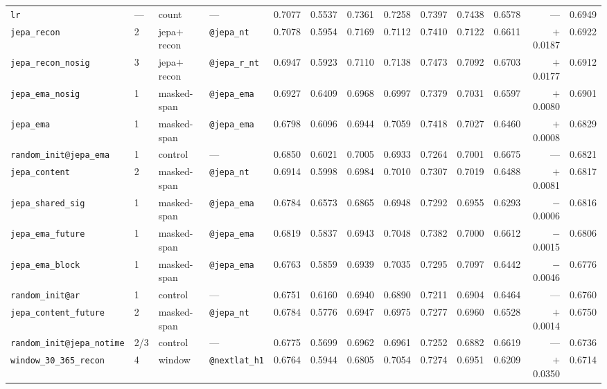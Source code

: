 \documentclass[11pt,a4paper]{article}
\newcommand{\code}[1]{\texttt{\small #1}}
\begin{document}
\begin{table}[p]
{\begin{tabular}{llll rrrrrrr rr}
\code{lr}                       & --- & count & --- & 0.7077 & 0.5537 & 0.7361 & 0.7258 & 0.7397 & 0.7438 & 0.6578 & --- & 0.6949 \\
\code{jepa\_recon}              & 2 & jepa$+$recon & \code{@jepa\_nt} & 0.7078 & 0.5954 & 0.7169 & 0.7112 & 0.7410 & 0.7122 & 0.6611 & $+$0.0187 & 0.6922 \\
\code{jepa\_recon\_nosig}       & 3 & jepa$+$recon & \code{@jepa\_r\_nt} & 0.6947 & 0.5923 & 0.7110 & 0.7138 & 0.7473 & 0.7092 & 0.6703 & $+$0.0177 & 0.6912 \\
\code{jepa\_ema\_nosig}         & 1 & masked-span & \code{@jepa\_ema} & 0.6927 & 0.6409 & 0.6968 & 0.6997 & 0.7379 & 0.7031 & 0.6597 & $+$0.0080 & 0.6901 \\
\code{jepa\_ema}                & 1 & masked-span & \code{@jepa\_ema} & 0.6798 & 0.6096 & 0.6944 & 0.7059 & 0.7418 & 0.7027 & 0.6460 & $+$0.0008 & 0.6829 \\
\code{random\_init@jepa\_ema}   & 1 & control & --- & 0.6850 & 0.6021 & 0.7005 & 0.6933 & 0.7264 & 0.7001 & 0.6675 & --- & 0.6821 \\
\code{jepa\_content}            & 2 & masked-span & \code{@jepa\_nt} & 0.6914 & 0.5998 & 0.6984 & 0.7010 & 0.7307 & 0.7019 & 0.6488 & $+$0.0081 & 0.6817 \\
\code{jepa\_shared\_sig}        & 1 & masked-span & \code{@jepa\_ema} & 0.6784 & 0.6573 & 0.6865 & 0.6948 & 0.7292 & 0.6955 & 0.6293 & $-$0.0006 & 0.6816 \\
\code{jepa\_ema\_future}        & 1 & masked-span & \code{@jepa\_ema} & 0.6819 & 0.5837 & 0.6943 & 0.7048 & 0.7382 & 0.7000 & 0.6612 & $-$0.0015 & 0.6806 \\
\code{jepa\_ema\_block}         & 1 & masked-span & \code{@jepa\_ema} & 0.6763 & 0.5859 & 0.6939 & 0.7035 & 0.7295 & 0.7097 & 0.6442 & $-$0.0046 & 0.6776 \\
\code{random\_init@ar}          & 1 & control & --- & 0.6751 & 0.6160 & 0.6940 & 0.6890 & 0.7211 & 0.6904 & 0.6464 & --- & 0.6760 \\
\code{jepa\_content\_future}    & 2 & masked-span & \code{@jepa\_nt} & 0.6784 & 0.5776 & 0.6947 & 0.6975 & 0.7277 & 0.6960 & 0.6528 & $+$0.0014 & 0.6750 \\
\code{random\_init@jepa\_notime}& 2/3 & control & --- & 0.6775 & 0.5699 & 0.6962 & 0.6961 & 0.7252 & 0.6882 & 0.6619 & --- & 0.6736 \\
\code{window\_30\_365\_recon}   & 4 & window & \code{@nextlat\_h1} & 0.6764 & 0.5944 & 0.6805 & 0.7054 & 0.7274 & 0.6951 & 0.6209 & $+$0.0350 & 0.6714 \\

\end{tabular}}
\end{table}
\end{document}
